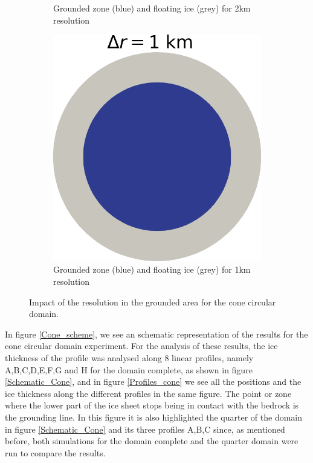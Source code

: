 \documentclass{article}
\begin{document}
\begin{figure}[!h]
\begin{subfigure}{0.25\textwidth}
		\caption{Grounded zone (blue) and floating ice (grey) for 2km resolution}
		\label{figCONE2}
	\end{subfigure}\hfil %
	\begin{subfigure}{0.25\textwidth}
		\includegraphics[width=\linewidth]{../fig/Grounded_zone_1km_CONE.png}
		\caption{Grounded zone (blue) and floating ice (grey) for 1km resolution}
		\label{CONE1KM}
	\end{subfigure}
	\caption{Impact of the resolution in the grounded area for the cone circular domain.}
	\label{figCONO1}
\end{figure}

In figure \ref{Cone_scheme}, we see an schematic representation of the results for the cone circular domain experiment. For the analysis of these results, the ice thickness of the profile was analysed along 8 linear profiles, namely A,B,C,D,E,F,G and H for the domain complete, as shown in figure \ref{Schematic_Cone}, and in figure \ref{Profiles_cone} we see all the positions and the ice thickness along the different profiles in the same figure. The point or zone where the lower part of the ice sheet stops being in contact with the bedrock is the grounding line. In this figure it is also highlighted the quarter of the domain in figure \ref{Schematic_Cone} and its three profiles A,B,C since, as mentioned before, both simulations for the domain complete and the quarter domain were run to compare the results.
\end{document}
